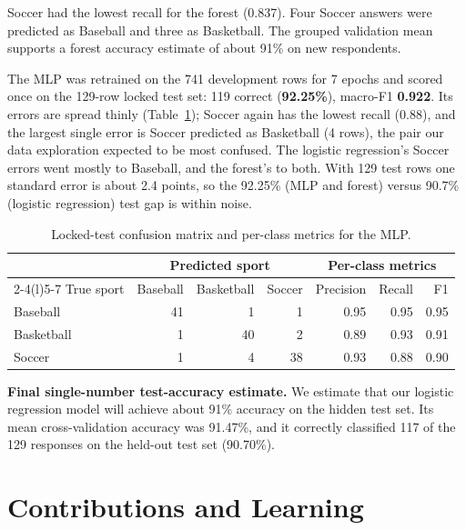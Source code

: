 \documentclass[12pt]{article}
\begin{document}
Soccer had the lowest recall for the forest (0.837). Four Soccer answers were predicted as
Baseball and three as Basketball. The grouped validation mean supports a forest accuracy estimate
of about 91\% on new respondents.

The MLP was retrained on the 741 development rows for 7 epochs and scored once on the 129-row locked
test set: 119 correct (\textbf{92.25\%}), macro-F1 \textbf{0.922}. Its errors are spread thinly
(Table~\ref{tab:mlp-confusion}); Soccer again has the lowest recall (0.88), and the largest single
error is Soccer predicted as Basketball (4 rows), the pair our data exploration expected to be most
confused. The logistic regression's Soccer errors went mostly to Baseball, and the forest's to both.
With 129 test rows one standard error is about 2.4 points, so the 92.25\% (MLP and forest) versus
90.7\% (logistic regression) test gap is within noise.

\begin{table}[ht]
\centering
\small
\begin{tabular}{@{}lrrrrrr@{}}
\toprule
 & \multicolumn{3}{c}{Predicted sport} & \multicolumn{3}{c}{Per-class metrics} \\
\cmidrule(lr){2-4}\cmidrule(l){5-7}
True sport & Baseball & Basketball & Soccer & Precision & Recall & F1 \\
\midrule
Baseball & 41 & 1 & 1 & 0.95 & 0.95 & 0.95 \\
Basketball & 1 & 40 & 2 & 0.89 & 0.93 & 0.91 \\
Soccer & 1 & 4 & 38 & 0.93 & 0.88 & 0.90 \\
\bottomrule
\end{tabular}
\caption{Locked-test confusion matrix and per-class metrics for the MLP.}
\label{tab:mlp-confusion}
\end{table}

\textbf{Final single-number test-accuracy estimate.} We estimate that our logistic regression model 
will achieve about 91\% accuracy on the hidden test set. Its mean cross-validation accuracy was 91.47\%, 
and it correctly classified 117 of the 129 responses on the held-out test set (90.70\%).

\section{Contributions and Learning}
\end{document}
